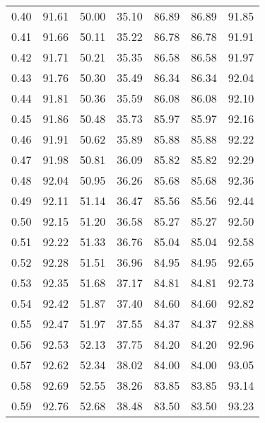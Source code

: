 \begin{tabular}{|c|c|c|c|c|c|c|}
      0.40 &     91.61 &     50.00 &      35.10 &   86.89 &      86.89 &         91.85 \\
      0.41 &     91.66 &     50.11 &      35.22 &   86.78 &      86.78 &         91.91 \\
      0.42 &     91.71 &     50.21 &      35.35 &   86.58 &      86.58 &         91.97 \\
      0.43 &     91.76 &     50.30 &      35.49 &   86.34 &      86.34 &         92.04 \\
      0.44 &     91.81 &     50.36 &      35.59 &   86.08 &      86.08 &         92.10 \\
      0.45 &     91.86 &     50.48 &      35.73 &   85.97 &      85.97 &         92.16 \\
      0.46 &     91.91 &     50.62 &      35.89 &   85.88 &      85.88 &         92.22 \\
      0.47 &     91.98 &     50.81 &      36.09 &   85.82 &      85.82 &         92.29 \\
      0.48 &     92.04 &     50.95 &      36.26 &   85.68 &      85.68 &         92.36 \\
      0.49 &     92.11 &     51.14 &      36.47 &   85.56 &      85.56 &         92.44 \\
      0.50 &     92.15 &     51.20 &      36.58 &   85.27 &      85.27 &         92.50 \\
      0.51 &     92.22 &     51.33 &      36.76 &   85.04 &      85.04 &         92.58 \\
      0.52 &     92.28 &     51.51 &      36.96 &   84.95 &      84.95 &         92.65 \\
      0.53 &     92.35 &     51.68 &      37.17 &   84.81 &      84.81 &         92.73 \\
      0.54 &     92.42 &     51.87 &      37.40 &   84.60 &      84.60 &         92.82 \\
      0.55 &     92.47 &     51.97 &      37.55 &   84.37 &      84.37 &         92.88 \\
      0.56 &     92.53 &     52.13 &      37.75 &   84.20 &      84.20 &         92.96 \\
      0.57 &     92.62 &     52.34 &      38.02 &   84.00 &      84.00 &         93.05 \\
      0.58 &     92.69 &     52.55 &      38.26 &   83.85 &      83.85 &         93.14 \\
      0.59 &     92.76 &     52.68 &      38.48 &   83.50 &      83.50 &         93.23 \\

\end{tabular}
